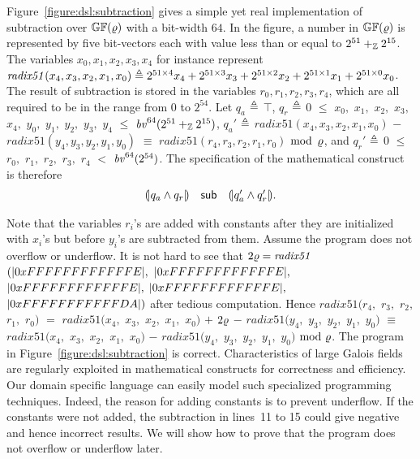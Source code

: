 Figure~\ref{figure:dsl:subtraction} gives a simple yet real implementation of subtraction over $\bbfGF(\myprime)$ with a bit-width $64$.
In the figure, a number in $\bbfGF(\varrho)$ is represented by five bit-vectors each with value less than or equal to $2^{51} +_\bbfZ 2^{15}$.
The variables ${x}_0, {x}_1, {x}_2, {x}_3, {x}_4$ for instance represent $\mathit{radix51}({x}_4, {x}_3, {x}_2, {x}_1, {x}_0) \defn 2^{51 \times 4} {x}_4 + 2^{51 \times 3} {x}_3 + 2^{51 \times 2} {x}_2 + 2^{51 \times 1} {x}_1 + 2^{51 \times 0} {x}_0$.
The result of subtraction is stored in the variables ${r}_0, {r}_1, {r}_2, {r}_3, {r}_4$, which are all required to be in the range from $0$ to $2^{54}$.
Let $q_a$ $\defn$ $\top$, $q_r$ $\defn$ $0$ $\leq$ ${x}_0,$ ${x}_1,$ ${x}_2,$ ${x}_3,$ ${x}_4,$ ${y}_0,$ ${y}_1,$ ${y}_2,$ ${y}_3,$ ${y}_4$ $\leq$ $\bv^{64}(2^{51} +_\bbfZ 2^{15})$, $q_a'$ $\defn$ $\mathit{radix51}({x}_4, {x}_3, {x}_2, {x}_1, {x}_0)$ $-$ $\mathit{radix51}({y}_4, {y}_3, {y}_2, {y}_1, {y}_0)$ $\equiv$ $\mathit{radix51}({r}_4, {r}_3, {r}_2, {r}_1, {r}_0)$ $\mod$ $\myprime$, and $q_r'$ $\defn$ $0$ $\leq$ ${r}_0,$ ${r}_1,$ ${r}_2,$ ${r}_3,$ ${r}_4$ $<$ $\bv^{64}(2^{54})$.
The specification of the mathematical construct is therefore
\[
\begin{array}{rcl}
\cond{q_a \wedge q_r} &
\dslcode{sub} &
\cond{q_a' \wedge q_r'}.
\end{array}
\]


Note that the variables ${r}_i$'s are added with constants after they are initialized with ${x}_i$'s but before ${y}_i$'s are subtracted from them.
Assume the program  does not overflow or underflow.
It is not hard to see that $2\myprime = \mathit{radix51}$ $(\unsigned{0xFFFFFFFFFFFFE},$ $\unsigned{0xFFFFFFFFFFFFE},$ $\unsigned{0xFFFFFFFFFFFFE},$ $\unsigned{0xFFFFFFFFFFFFE},$ $\unsigned{0xFFFFFFFFFFFDA})$ after tedious computation.
Hence $\mathit{radix51}({r}_4,$ ${r}_3,$ ${r}_2,$ ${r}_1,$ ${r}_0)$ $=$ $\mathit{radix51}({x}_4,$ ${x}_3,$ ${x}_2,$ ${x}_1,$ ${x}_0)$ $+$ $2 \myprime $ $-$
$\mathit{radix51}({y}_4,$ ${y}_3,$ ${y}_2,$ ${y}_1,$ ${y}_0)$ $\equiv$ $\mathit{radix51}({x}_4,$ ${x}_3,$ ${x}_2,$ ${x}_1,$ ${x}_0)$ $-$ $\mathit{radix51}({y}_4,$ ${y}_3,$ ${y}_2,$ ${y}_1,$ ${y}_0)$ $\mod\ \myprime$.
The program in Figure~\ref{figure:dsl:subtraction} is correct.
Characteristics of large Galois fields are regularly exploited in mathematical constructs for correctness and efficiency.
Our domain specific language can easily model such specialized programming techniques.
Indeed, the reason for adding constants is to prevent underflow.
If the constants were not added, the subtraction in lines~11 to 15 could give negative and hence incorrect results.
We will show how to prove that the program does not overflow or underflow later.


